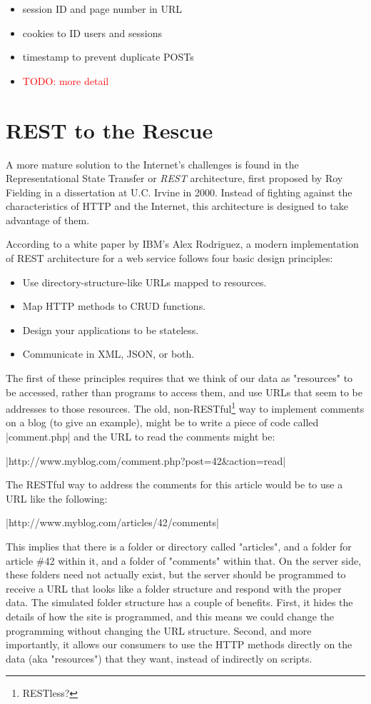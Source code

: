 \documentclass[11pt]{book}
\newcommand{\term}[1]{\emph{#1}} %
\newcommand{\todo}[1]{\textcolor{red}{TODO: #1}} %
\begin{document}
\begin{itemize}
    \item session ID and page number in URL
    \item cookies to ID users and sessions
    \item timestamp to prevent duplicate POSTs
    \item \todo{more detail}
\end{itemize}

\section{REST to the Rescue}
A more mature solution to the Internet's challenges is found in the Representational State Transfer or \term{REST} architecture, first proposed by Roy Fielding in a dissertation at U.C. Irvine in 2000.  Instead of fighting against the characteristics of HTTP and the Internet, this architecture is designed to take advantage of them.

According to a white paper by IBM's Alex Rodriguez, a modern implementation of REST architecture for a web service follows four basic design principles:

\begin{itemize}
    \item Use directory-structure-like URLs mapped to resources.
    \item Map HTTP methods to CRUD functions.
    \item Design your applications to be stateless.
    \item Communicate in XML, JSON, or both.
\end{itemize}

The first of these principles requires that we think of our data as "resources" to be accessed, rather than programs to access them, and use URLs that seem to be addresses to those resources.  The old, non-RESTful\footnote{RESTless?} way to implement comments on a blog (to give an example), might be to write a piece of code called |comment.php| and the URL to read the comments might be:

|http://www.myblog.com/comment.php?post=42\&action=read|

The RESTful way to address the comments for this article would be to use a URL like the following:

|http://www.myblog.com/articles/42/comments|

This implies that there is a folder or directory called "articles", and a folder for article \#42 within it, and a folder of "comments" within that.  On the server side, these folders need not actually exist, but the server should be programmed to receive a URL that looks like a folder structure and respond with the proper data.  The simulated folder structure has a couple of benefits.  First, it hides the details of how the site is programmed, and this means we could change the programming without changing the URL structure.  Second, and more importantly, it allows our consumers to use the HTTP methods directly on the data (aka "resources") that they want, instead of indirectly on scripts.
\end{document}
